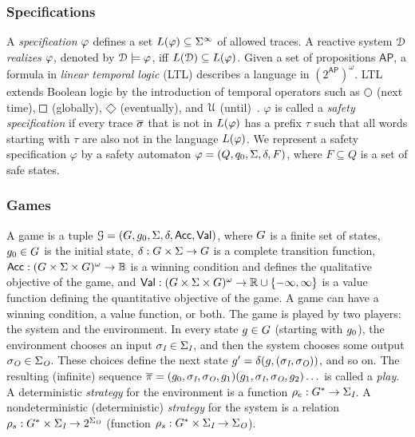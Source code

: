 \subsubsection{Specifications}

A \emph{specification} $\varphi$ defines a set $L(\varphi) \subseteq \Sigma^\infty$ of allowed traces.
%
A reactive system $\mathcal{D}$ \emph{realizes} $\varphi$, denoted by $\mathcal{D} \models \varphi$, iff
$L(\mathcal{D}) \subseteq L(\varphi)$.
Given a set of propositions $\mathsf{AP}$, a formula in \emph{linear temporal logic} (LTL) describes a language in $(2^\mathsf{AP})^\omega$. LTL extends Boolean logic by the introduction of temporal operators such as $\LTLnext$ (next time), $\LTLglobally$ (globally), $\LTLfinally$ (eventually), and $\operatorname{\mathcal{U}}$ (until)~\cite{Pnueli77}.
%
$\varphi$ is called a \emph{safety specification} if every trace $\overline\sigma$ that is not in  $L(\varphi)$  has a prefix $\tau$ such that all words starting with $\tau$ are also not in the language $L(\varphi)$.
We represent a safety specification $\varphi$ by a safety automaton
$\varphi = (Q, q_0, \Sigma, \delta, F)$, where $F\subseteq Q$ is a set of safe states.

\subsubsection{Games}
%
A game is a tuple $\mathcal{G} = (G,
g_0, \Sigma, \delta, \mathsf{Acc}, \mathsf{Val})$,
where $G$ is a finite set of states, $g_0 \in G$ is the initial state,
$\delta: G \times \Sigma \rightarrow G$
is a complete transition function, $\mathsf{Acc}: (G \times \Sigma \times G)^\omega \rightarrow \mathbb{B}$ is a winning condition
and defines the qualitative objective of the game, and $\mathsf{Val}: (G \times \Sigma \times G)^\omega \rightarrow \mathbb{R} \cup \{-\infty, \infty \}$ is a value function defining the quantitative objective of the game. A game can have a winning condition, a value function, or both.
%
The game is played  by two players:  the system and the environment. In every state $g\in G$
(starting with $g_0$), the environment chooses an input
$\sigma_{\textit{I}} \in \Sigma_{\textit{I}}$, and then the system chooses some output $\sigma_{\textit{O}} \in \Sigma_{\textit{O}}$. These choices define the next state $g' = \delta(g,(\sigma_{\textit{I}}, \sigma_{\textit{O}}))$, and so on. The resulting (infinite)
sequence $\overline{\pi} = (g_0,\sigma_{\textit{I}}, \sigma_{\textit{O}}, g_1) (g_1,\sigma_{\textit{I}}, \sigma_{\textit{O}}, g_2) \ldots$ is called a \emph{play}.
A deterministic  \emph{strategy} for the environment is a function
$\rho_e: G^* \rightarrow \Sigma_{\textit{I}}$.
A nondeterministic (deterministic) \emph{strategy} for the system is a relation $\rho_s:
G^* \times \Sigma_{\textit{I}} \rightarrow 2^{\Sigma_{\textit{O}}}$  (function $\rho_s:
G^* \times \Sigma_{\textit{I}} \rightarrow \Sigma_{\textit{O}}$).


